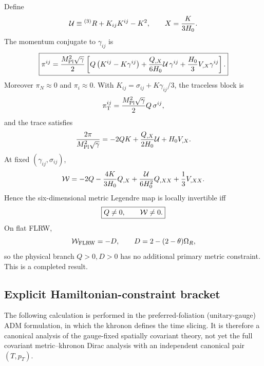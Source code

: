 \documentclass[11pt,a4paper]{article}
\begin{document}
Define
\begin{equation}
 {\cal U}\equiv{}^{(3)}R+K_{ij}K^{ij}-K^2,
 \qquad X=\frac{K}{3H_0}.
\end{equation}
The momentum conjugate to \(\gamma_{ij}\) is
\begin{equation}
\boxed{
 \pi^{ij}
 =\frac{M_{\rm Pl}^2\sqrt{\gamma}}{2}
 \left[
 Q\left(K^{ij}-K\gamma^{ij}\right)
 +\frac{Q_{,X}}{6H_0}{\cal U}\,\gamma^{ij}
 +\frac{H_0}{3}V_{,X}\gamma^{ij}
 \right].
}
\label{eq:audited-momentum}
\end{equation}
Moreover \(\pi_N\approx0\) and \(\pi_i\approx0\).
With \(K_{ij}=\sigma_{ij}+K\gamma_{ij}/3\), the traceless block is
\begin{equation}
 \pi_{\rm T}^{ij}=\frac{M_{\rm Pl}^2\sqrt{\gamma}}{2}Q\,\sigma^{ij},
\end{equation}
and the trace satisfies
\begin{equation}
 \frac{2\pi}{M_{\rm Pl}^2\sqrt{\gamma}}
 =-2QK+\frac{Q_{,X}}{2H_0}{\cal U}+H_0V_{,X}.
\end{equation}
At fixed \((\gamma_{ij},\sigma_{ij})\),
\begin{equation}
 {\cal W}
 =-2Q-\frac{4K}{3H_0}Q_{,X}
 +\frac{{\cal U}}{6H_0^2}Q_{,XX}
 +\frac13V_{,XX}.
\label{eq:audited-W}
\end{equation}
Hence the six-dimensional metric Legendre map is locally invertible iff
\begin{equation}
 \boxed{Q\neq0,\qquad {\cal W}\neq0.}
\end{equation}
On flat FLRW,
\begin{equation}
 {\cal W}_{\rm FLRW}=-D,\qquad
 D=2-(2-\theta)\Omega_R,
\end{equation}
so the physical branch \(Q>0,D>0\) has no additional primary metric
constraint.  This is a completed result.


\subsection{Explicit Hamiltonian-constraint bracket}

The following calculation is performed in the preferred-foliation (unitary-gauge)
ADM formulation, in which the khronon defines the time slicing. It is therefore
a canonical analysis of the gauge-fixed spatially covariant theory, not yet the
full covariant metric--khronon Dirac analysis with an independent canonical pair
\((T,p_T)\).
\end{document}
